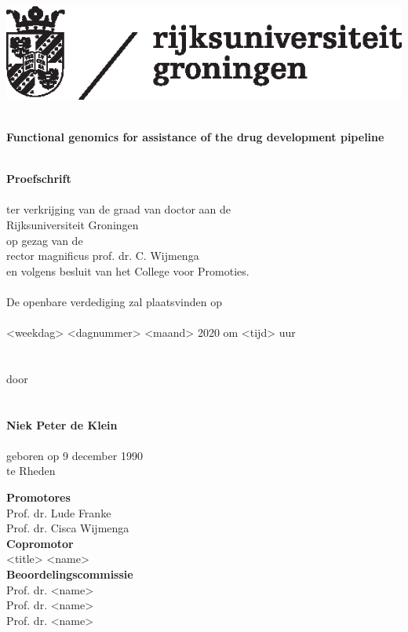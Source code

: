 \begin{flushleft}
\includegraphics[scale=0.8]{img/rugr_logonl_zwart_cmyk}
\end{flushleft}

\begin{center}
\linespread{1.00} %
~\\
\huge
\textbf{Functional genomics for assistance of the drug development pipeline}
\\~\\
\linespread{1.05} %


\large
\textbf{Proefschrift}
\\~\\
\normalsize
ter verkrijging van de graad van doctor aan de\\
Rijksuniversiteit Groningen\\
op gezag van de\\
rector magnificus prof. dr. C. Wijmenga\\
en volgens besluit van het College voor Promoties.
\\~\\
De openbare verdediging zal plaatsvinden op
\\~\\
<weekdag> <dagnummer> <maand> 2020 om <tijd> uur 
\\~\\~\\
door
\\~\\~\\
\large
\textbf{Niek Peter de Klein}
\\~\\
\normalsize
geboren op 9 december 1990\\
te Rheden\\
\normalsize
\end{center}

\clearpage

\noindent
\textbf{Promotores}\\
Prof. dr. Lude Franke\\
Prof. dr. Cisca Wijmenga\\

\noindent
\textbf{Copromotor}\\
<title> <name>\\

\noindent
\textbf{Beoordelingscommissie}\\
Prof. dr. <name>\\
Prof. dr. <name>\\
Prof. dr. <name>\\
